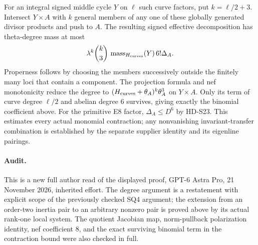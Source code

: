 For an integral signed middle cycle \(Y\) on \(\ell\) such curve
factors, put \(k=\ell/2+3\). Intersect
\(Y\times A\) with \(k\) general members of any one of these
globally generated divisor products and push to \(A\). The resulting
signed effective decomposition has theta-degree mass at most
\begin{equation}\label{eq:S25-contraction-bound}
 \lambda^k\binom{k}{3}\,
       \operatorname{mass}_{H_{\rm curves}}(Y)\,6!\Delta_A.
\end{equation}
Properness follows by choosing the members successively outside the
finitely many loci that contain a component. The projection formula
and nef monotonicity reduce the degree to
\((H_{\rm curves}+\theta_A)^k\theta_A^3\) on \(Y\times A\).
Only its term of curve degree \(\ell/2\) and abelian degree 6
survives, giving exactly the binomial coefficient above.
For the primitive E8 factor, \(\Delta_A\le D^6\) by HD-S23.
This estimates every actual monomial contraction; any nonvanishing
invariant-transfer combination is established by the separate supplier
identity and its eigenline pairings.

\paragraph{Audit.}
This is a new full author read of the displayed proof, GPT-6 Astra Pro,
21 November 2026, inherited effort. The degree argument is a
restatement with explicit scope of the previously checked SQ4 argument;
the extension from an order-two inertia pair to an arbitrary nonzero
pair is proved above by its actual rank-one local system. The quotient
Jacobian map, norm-pullback polarization identity, nef coefficient 8,
and the exact surviving binomial term in the contraction bound were
also checked in full.
